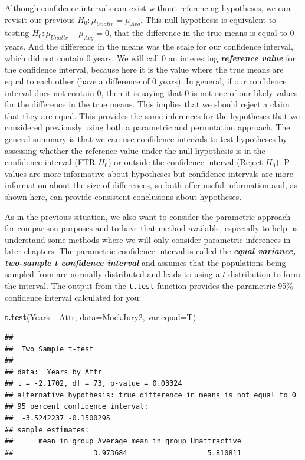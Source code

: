 \documentclass[]{book}
\newenvironment{Shaded}{\begin{snugshade}}{\end{snugshade}}
\newcommand{\KeywordTok}[1]{\textcolor[rgb]{0.13,0.29,0.53}{\textbf{{#1}}}}
\newcommand{\DataTypeTok}[1]{\textcolor[rgb]{0.13,0.29,0.53}{{#1}}}
\newcommand{\StringTok}[1]{\textcolor[rgb]{0.31,0.60,0.02}{{#1}}}
\newcommand{\NormalTok}[1]{{#1}}
\begin{document}
Although confidence intervals can exist without referencing hypotheses,
we can revisit our previous \(H_0: \mu_{Unattr} = \mu_{Avg}\). This null
hypothesis is equivalent to testing
\(H_0: \mu_{Unattr} - \mu_{Avg} = 0\), that the difference in the true
means is equal to 0 years. And the difference in the means was the scale
for our confidence interval, which did not contain 0 years. We will call
0 an interesting \textbf{\emph{reference value}} for the confidence
interval, because here it is the value where the true means are equal to
each other (have a difference of 0 years). In general, if our confidence
interval does not contain 0, then it is saying that 0 is not one of our
likely values for the difference in the true means. This implies that we
should reject a claim that they are equal. This provides the same
inferences for the hypotheses that we considered previously using both a
parametric and permutation approach. The general summary is that we can
use confidence intervals to test hypotheses by assessing whether the
reference value under the null hypothesis is in the confidence interval
(FTR \(H_0\)) or outside the confidence interval (Reject \(H_0\)).
P-values are more informative about hypotheses but confidence intervals
are more information about the size of differences, so both offer useful
information and, as shown here, can provide consistent conclusions about
hypotheses.

As in the previous situation, we also want to consider the parametric
approach for comparison purposes and to have that method available,
especially to help us understand some methods where we will only
consider parametric inferences in later chapters. The parametric
confidence interval is called the \textbf{\emph{equal variance,
two-sample t confidence interval}} and assumes that the populations
being sampled from are normally distributed and leads to using a
\(t\)-distribution to form the interval. The output from the
\texttt{t.test} function provides the parametric 95\% confidence
interval calculated for you:

\begin{Shaded}
\begin{Highlighting}[]
\KeywordTok{t.test}\NormalTok{(Years ~}\StringTok{ }\NormalTok{Attr, }\DataTypeTok{data=}\NormalTok{MockJury2, }\DataTypeTok{var.equal=}\NormalTok{T)}
\end{Highlighting}
\end{Shaded}

\begin{verbatim}
## 
##  Two Sample t-test
## 
## data:  Years by Attr
## t = -2.1702, df = 73, p-value = 0.03324
## alternative hypothesis: true difference in means is not equal to 0
## 95 percent confidence interval:
##  -3.5242237 -0.1500295
## sample estimates:
##      mean in group Average mean in group Unattractive 
##                   3.973684                   5.810811
\end{verbatim}
\end{document}

